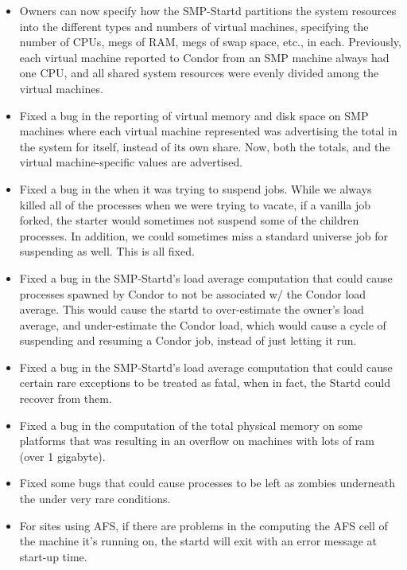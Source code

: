 \begin{itemize}

\item Owners can now specify how the SMP-Startd partitions the system
resources into the different types and numbers of virtual machines,
specifying the number of CPUs, megs of RAM, megs of swap space, etc.,
in each.
Previously, each virtual machine reported to Condor from an SMP
machine always had one CPU, and all shared system resources were
evenly divided among the virtual machines.

\item Fixed a bug in the reporting of virtual memory and disk space on
SMP machines where each virtual machine represented was advertising
the total in the system for itself, instead of its own share.
Now, both the totals, and the virtual machine-specific values are
advertised.  

\item Fixed a bug in the  when it was trying to
suspend jobs.
While we always killed all of the processes when we were trying to
vacate, if a vanilla job forked, the starter would sometimes not
suspend some of the children processes.
In addition, we could sometimes miss a standard universe job for
suspending as well.
This is all fixed.

\item Fixed a bug in the SMP-Startd's load average computation that
could cause processes spawned by Condor to not be associated w/ the
Condor load average.
This would cause the startd to over-estimate the owner's load average,
and under-estimate the Condor load, which would cause a cycle of
suspending and resuming a Condor job, instead of just letting it run.

\item Fixed a bug in the SMP-Startd's load average computation that
could cause certain rare exceptions to be treated as fatal, when in
fact, the Startd could recover from them.

\item Fixed a bug in the computation of the total physical memory on
some platforms that was resulting in an overflow on machines with
lots of ram (over 1 gigabyte).

\item Fixed some bugs that could cause  processes to
be left as zombies underneath the  under very rare
conditions.  

\item For sites using AFS, if there are problems in the
 computing the AFS cell of the machine it's running on,
the startd will exit with an error message at start-up time.


\end{itemize}
